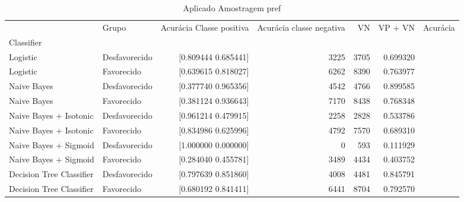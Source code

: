     \begin{table}
        \centering
        \caption{Aplicado Amostragem pref}
        \label{Aplicado Amostragem pref 5}
        \begin{tabular}{llrrrrr}
        \toprule
        {} &          Grupo             &  Acurácia Classe positiva &  Acurácia classe negativa &   VN  &  VP + VN  &  Acurácia \\
        Classifier               &                &                           &                           &       &           &           \\
        \midrule
        Logistic                 &  Desfavorecido &                  [0.809444  0.685441] &  3225 &      3705 &  0.699320 \\
        Logistic                 &     Favorecido &                  [0.639615  0.818027] &  6262 &      8390 &  0.763977 \\
        Naive Bayes              &  Desfavorecido &                  [0.377740  0.965356] &  4542 &      4766 &  0.899585 \\
        Naive Bayes              &     Favorecido &                  [0.381124  0.936643] &  7170 &      8438 &  0.768348 \\
        Naive Bayes + Isotonic   &  Desfavorecido &                  [0.961214  0.479915] &  2258 &      2828 &  0.533786 \\
        Naive Bayes + Isotonic   &     Favorecido &                  [0.834986  0.625996] &  4792 &      7570 &  0.689310 \\
        Naive Bayes + Sigmoid    &  Desfavorecido &                  [1.000000  0.000000] &     0 &       593 &  0.111929 \\
        Naive Bayes + Sigmoid    &     Favorecido &                  [0.284040  0.455781] &  3489 &      4434 &  0.403752 \\
        Decision Tree Classifier &  Desfavorecido &                  [0.797639  0.851860] &  4008 &      4481 &  0.845791 \\
        Decision Tree Classifier &     Favorecido &                  [0.680192  0.841411] &  6441 &      8704 &  0.792570 \\
        \bottomrule
        \end{tabular}
    \end{table}
        
